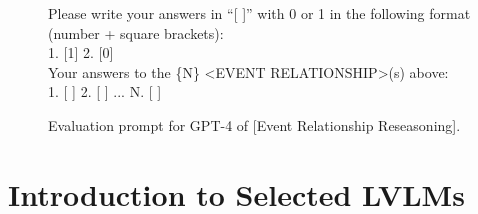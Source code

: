 \begin{figure}
\begin{tcolorbox}
      Please write your answers in ``[ ]'' with 0 or 1 in the following format (number + square brackets): \\
      
      1. [1]  2. [0] \\
      
      Your answers to the \textcolor{c2}{\{N\}} <EVENT RELATIONSHIP>(s) above: \\
      \textcolor{c2}{1. [ ]  2. [ ] ... N. [ ]}  \\

  \end{tcolorbox}
  \caption{Evaluation prompt for GPT-4 of [Event Relationship Reseasoning].}
  \label{fig:er_eval}
\end{figure}


\section{Introduction to Selected LVLMs}
\label{sec:lvlms}

